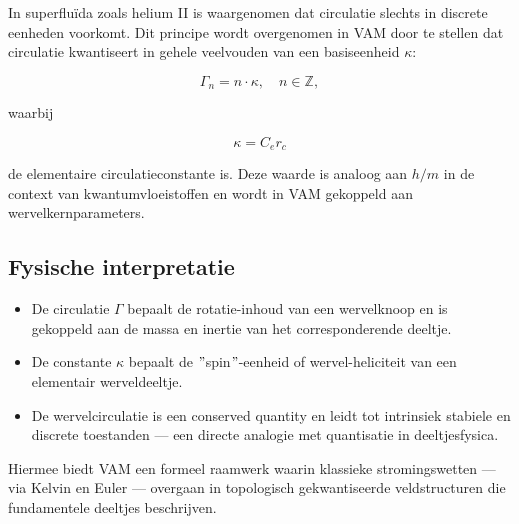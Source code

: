 In superfluïda zoals helium II is waargenomen dat circulatie slechts in discrete eenheden voorkomt. Dit principe wordt overgenomen in VAM door te stellen dat circulatie kwantiseert in gehele veelvouden van een basiseenheid \( \kappa \):

\begin{equation}
\Gamma_n = n \cdot \kappa, \quad n \in \mathbb{Z},
\end{equation}

waarbij

\begin{equation}
\kappa = C_e r_c
\end{equation}

de elementaire circulatieconstante is. Deze waarde is analoog aan \( h/m \) in de context van kwantumvloeistoffen en wordt in VAM gekoppeld aan wervelkernparameters.

\subsection{Fysische interpretatie}

\begin{itemize}
    \item De circulatie \( \Gamma \) bepaalt de rotatie-inhoud van een wervelknoop en is gekoppeld aan de massa en inertie van het corresponderende deeltje.
    \item De constante \( \kappa \) bepaalt de \("\)spin\("\)-eenheid of wervel-heliciteit van een elementair werveldeeltje.
    \item De wervelcirculatie is een conserved quantity en leidt tot intrinsiek stabiele en discrete toestanden — een directe analogie met quantisatie in deeltjesfysica.
\end{itemize}

Hiermee biedt VAM een formeel raamwerk waarin klassieke stromingswetten — via Kelvin en Euler — overgaan in topologisch gekwantiseerde veldstructuren die fundamentele deeltjes beschrijven.
